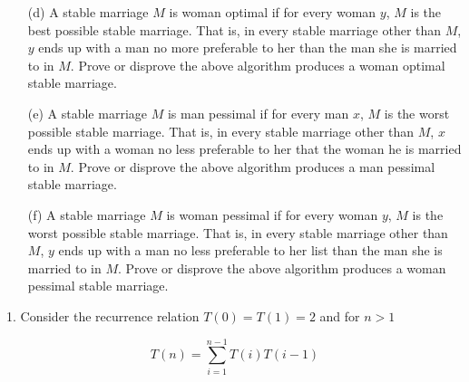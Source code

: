 \documentclass[10pt]{article}
\begin{document}
\begin{enumerate}
				\item[(d)]  A stable marriage $M$  is woman optimal if for every woman $y$,  $M$  is the best  possible stable
										marriage.   That is,  in every  stable marriage other  than $M$,  $y$  ends  up with a  man no  more
										preferable to her than the man she is married to in $M$.  Prove or disprove the above algorithm
										produces a woman optimal stable marriage.
				\item[(e)]  A stable marriage $M$ is man pessimal if for every man $x$, $M$ is the worst possible stable marriage.
										That is, in every stable marriage other than $M$, $x$ ends up with a woman no less preferable to her
										that the woman he is married to in $M$.  Prove or disprove the above algorithm produces a man
										pessimal stable marriage.
				\item[(f)]  A stable marriage $M$  is woman pessimal if for every woman $y$, $M$  is the worst possible stable
										marriage. That is, in every stable marriage other than $M$, $y$ ends up with a man no less preferable
										to her list than the man she is married to in $M$. Prove or disprove the above algorithm produces
										a woman pessimal stable marriage.
			\end{enumerate}
	1. Consider the recurrence relation $T(0) = T(1) = 2$ and for $n > 1$
	
	\[T(n) = \sum\limits_{i=1}^{n-1} T(i)T(i-1) \]
	
\end{document}
